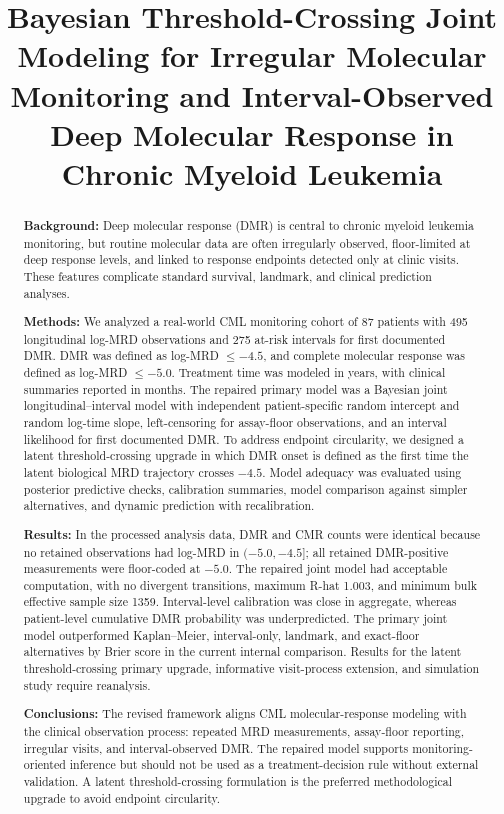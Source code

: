 \title{Bayesian Threshold-Crossing Joint Modeling for Irregular Molecular Monitoring and Interval-Observed Deep Molecular Response in Chronic Myeloid Leukemia}

\begin{abstract}
\textbf{Background:}
Deep molecular response (DMR) is central to chronic myeloid leukemia monitoring, but routine molecular data are often irregularly observed, floor-limited at deep response levels, and linked to response endpoints detected only at clinic visits. These features complicate standard survival, landmark, and clinical prediction analyses.

\textbf{Methods:}
We analyzed a real-world CML monitoring cohort of 87 patients with 495 longitudinal log-MRD observations and 275 at-risk intervals for first documented DMR. DMR was defined as log-MRD \(\le -4.5\), and complete molecular response was defined as log-MRD \(\le -5.0\). Treatment time was modeled in years, with clinical summaries reported in months. The repaired primary model was a Bayesian joint longitudinal--interval model with independent patient-specific random intercept and random log-time slope, left-censoring for assay-floor observations, and an interval likelihood for first documented DMR. To address endpoint circularity, we designed a latent threshold-crossing upgrade in which DMR onset is defined as the first time the latent biological MRD trajectory crosses \(-4.5\). Model adequacy was evaluated using posterior predictive checks, calibration summaries, model comparison against simpler alternatives, and dynamic prediction with recalibration.

\textbf{Results:}
In the processed analysis data, DMR and CMR counts were identical because no retained observations had log-MRD in \((-5.0,-4.5]\); all retained DMR-positive measurements were floor-coded at \(-5.0\). The repaired joint model had acceptable computation, with no divergent transitions, maximum R-hat 1.003, and minimum bulk effective sample size 1359. Interval-level calibration was close in aggregate, whereas patient-level cumulative DMR probability was underpredicted. The primary joint model outperformed Kaplan--Meier, interval-only, landmark, and exact-floor alternatives by Brier score in the current internal comparison. Results for the latent threshold-crossing primary upgrade, informative visit-process extension, and simulation study require reanalysis.

\textbf{Conclusions:}
The revised framework aligns CML molecular-response modeling with the clinical observation process: repeated MRD measurements, assay-floor reporting, irregular visits, and interval-observed DMR. The repaired model supports monitoring-oriented inference but should not be used as a treatment-decision rule without external validation. A latent threshold-crossing formulation is the preferred methodological upgrade to avoid endpoint circularity.
\end{abstract}

